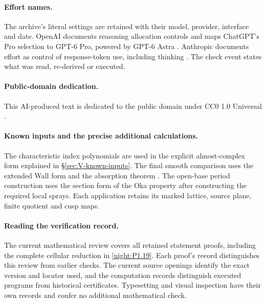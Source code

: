 \documentclass[11pt,a4paper]{article}
\theoremstyle{definition}
\begin{document}
\paragraph{Effort names.}
The archive's literal settings are retained with their model, provider,
interface and date. OpenAI documents reasoning allocation controls
\cite[sections ``Reasoning effort'' and ``Reasoning mode'']{OpenAIReasoning2026}
and maps ChatGPT's Pro selection to GPT-6 Pro, powered by GPT-6 Astra
\cite[section ``Choose a thinking level'']{OpenAIChatGPTPro2026}.
Anthropic documents effort as control of response-token use, including
thinking \cite[sections ``How effort works'' and ``Effort levels'']{AnthropicEffort2026}.
The check event states what was read, re-derived or executed.

\paragraph{Public-domain dedication.}
This AI-produced text is dedicated to the public domain under
CC0 1.0 Universal \cite{CC01Universal}.



\paragraph{Known inputs and the precise additional calculations.}
The characteristic index polynomials are used in the explicit
almost-complex form explained in \S\ref{sec:V-known-inputs}.
The final smooth comparison uses the extended Wall form
\cite[Definition 3.6 and Theorem 3.7(1), pp.~12--14]{IVVWallForm}
and the absorption theorem
\cite[Theorem A, p.~178]{IVVKramerStolz}.
The open-base period construction uses the section form of the Oka
property \cite[Definition 7.7, p.~22; Proposition 7.13(d), p.~24]{IVVOkaOneV5}
after constructing the required local sprays. Each application retains
its marked lattice, source plane, finite quotient and cusp maps.

\paragraph{Reading the verification record.}
The current mathematical review covers all retained statement proofs,
including the complete cellular reduction in \cref{night:P1.19}.
Each proof's record distinguishes this review from earlier checks.
The current source openings identify the exact version and locator
used, and the computation records distinguish executed programs from
historical certificates. Typesetting and visual inspection have their
own records and confer no additional mathematical check.
\end{document}
